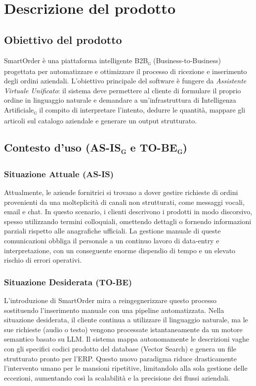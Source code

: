 \documentclass[a4paper, 11pt, oneside]{scrartcl} %
\begin{document}
\section{Descrizione del prodotto}

\subsection{Obiettivo del prodotto}
SmartOrder è una piattaforma intelligente B2B\textsubscript{\textsc{g}} (Business-to-Business) progettata per automatizzare e ottimizzare il processo di ricezione e inserimento degli ordini aziendali.
L'obiettivo principale del software è fungere da \textit{Assistente Virtuale Unificato}: il sistema deve permettere al cliente di formulare il proprio ordine in linguaggio naturale e demandare a un'infrastruttura di Intelligenza Artificiale\textsubscript{\textsc{g}} il compito di interpretare l'intento, dedurre le quantità, mappare gli articoli sul catalogo aziendale e generare un output strutturato.

\subsection{Contesto d'uso (AS-IS\textsubscript{\textsc{g}} e TO-BE\textsubscript{\textsc{g}})}

\subsubsection*{Situazione Attuale (AS-IS)}
Attualmente, le aziende fornitrici si trovano a dover gestire richieste di ordini provenienti da una molteplicità di canali non strutturati, come messaggi vocali, email e chat. In questo scenario, i clienti descrivono i prodotti in modo discorsivo, spesso utilizzando termini colloquiali, omettendo dettagli o fornendo informazioni parziali rispetto alle anagrafiche ufficiali. La gestione manuale di queste comunicazioni obbliga il personale a un continuo lavoro di data-entry e interpretazione, con un conseguente enorme dispendio di tempo e un elevato rischio di errori operativi.

\subsubsection*{Situazione Desiderata (TO-BE)}
L'introduzione di SmartOrder mira a reingegnerizzare questo processo sostituendo l'inserimento manuale con una pipeline automatizzata. Nella situazione desiderata, il cliente continua a utilizzare il linguaggio naturale, ma le sue richieste (audio o testo) vengono processate istantaneamente da un motore semantico basato su LLM. Il sistema mappa autonomamente le descrizioni vaghe con gli specifici codici prodotto del database (Vector Search) e genera un file strutturato pronto per l'ERP. Questo nuovo paradigma riduce drasticamente l'intervento umano per le mansioni ripetitive, limitandolo alla sola gestione delle eccezioni, aumentando così la scalabilità e la precisione dei flussi aziendali.
\end{document}
